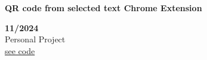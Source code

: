 \begin{minipage}{0.8\textwidth}
    \parbox{0.8\linewidth}{\textbf{QR code from selected text Chrome Extension}}  \hfill  \textbf{11/2024}\\
    Personal Project\\
    \href{https://github.com/JavierOramas/qr-popup-chrome-extension}{see code}\\
    \end{minipage} \hfill {}\\\\

